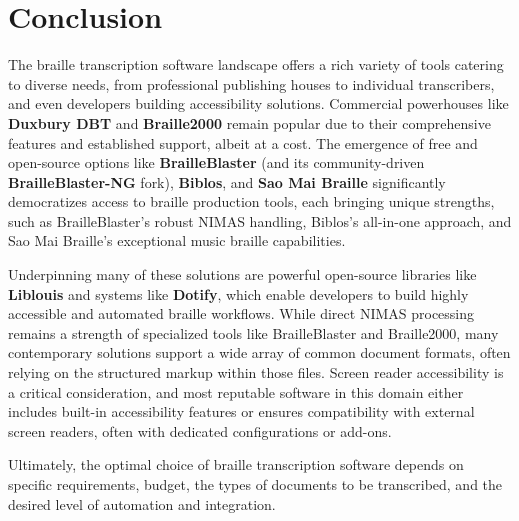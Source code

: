 \section{Conclusion}
The braille transcription software landscape offers a rich variety of tools catering to diverse needs, from professional publishing houses to individual transcribers, and even developers building accessibility solutions. Commercial powerhouses like \textbf{Duxbury DBT} and \textbf{Braille2000} remain popular due to their comprehensive features and established support, albeit at a cost. The emergence of free and open-source options like \textbf{BrailleBlaster} (and its community-driven \textbf{BrailleBlaster-NG} fork), \textbf{Biblos}, and \textbf{Sao Mai Braille} significantly democratizes access to braille production tools, each bringing unique strengths, such as BrailleBlaster's robust NIMAS handling, Biblos's all-in-one approach, and Sao Mai Braille's exceptional music braille capabilities.

Underpinning many of these solutions are powerful open-source libraries like \textbf{Liblouis} and systems like \textbf{Dotify}, which enable developers to build highly accessible and automated braille workflows. While direct NIMAS processing remains a strength of specialized tools like BrailleBlaster and Braille2000, many contemporary solutions support a wide array of common document formats, often relying on the structured markup within those files. Screen reader accessibility is a critical consideration, and most reputable software in this domain either includes built-in accessibility features or ensures compatibility with external screen readers, often with dedicated configurations or add-ons.

Ultimately, the optimal choice of braille transcription software depends on specific requirements, budget, the types of documents to be transcribed, and the desired level of automation and integration.
